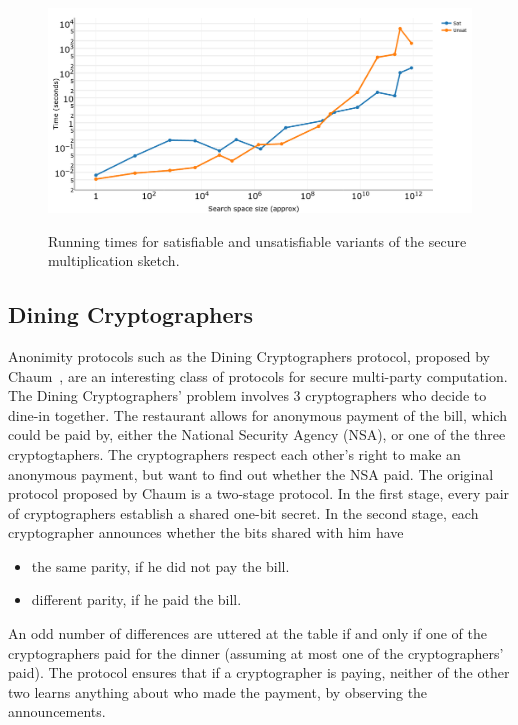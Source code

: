 \documentclass[preprint]{sig-alternate-05-2015}
\begin{document}
\begin{figure}
\centering
\includegraphics[width=\columnwidth]{plot-sec-mult-no-labels.png}
\label{fig:plot-sec-mult}
\caption{Running times for satisfiable and unsatisfiable variants of 
the secure multiplication sketch.}
\end{figure}

\subsection{Dining Cryptographers}

Anonimity protocols such as the Dining Cryptographers protocol,
proposed by Chaum~\cite{Chaum88}, are an interesting class of protocols for secure
multi-party computation.
The Dining Cryptographers' problem involves 3 cryptographers who decide to
dine-in together. The restaurant allows for anonymous payment of the bill,
which could be paid by, either the National Security Agency (NSA),
or one of the three cryptogtaphers.
The cryptographers respect each other's right to make an anonymous payment, 
but want to find out whether the NSA paid.
The original protocol proposed by Chaum is a two-stage protocol.
In the first stage, every pair of cryptographers establish 
a shared one-bit secret. 
In the second stage, each cryptographer announces 
whether the bits shared with him have
\begin{itemize}
    \item the same parity, if he did not pay the bill.
    \item different parity, if he paid the bill.
\end{itemize}
An odd number of differences are uttered at the table if and only if
one of the cryptographers paid for the dinner (assuming at most 
one of the cryptographers' paid).
The protocol ensures that if a cryptographer is paying, 
neither of the other two learns anything about who made the payment, 
by observing the announcements.
\end{document}
